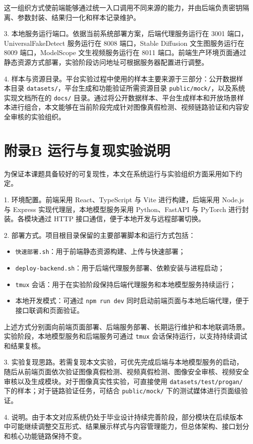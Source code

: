 这一组织方式使前端能够通过统一入口调用不同来源的能力，并由后端负责密钥隔离、参数封装、结果归一化和样本记录维护。

3. 本地服务运行端口。依据当前系统部署方案，后端代理服务运行在 3001 端口，UniversalFakeDetect 服务运行在 8008 端口，Stable Diffusion 文生图服务运行在 8009 端口，ModelScope 文生视频服务运行在 8011 端口。前端生产环境页面通过静态资源方式部署，实验阶段访问地址可根据服务器配置进行调整。

4. 样本与资源目录。平台实验过程中使用的样本主要来源于三部分：公开数据样本目录 \texttt{datasets/}，平台生成和功能验证所需资源目录 \texttt{public/mock/}，以及系统实现文档所在的 \texttt{docs/} 目录。通过将公开数据样本、平台生成样本和开放场景样本进行组合，本文能够在当前阶段完成针对图像真假检测、视频链路验证和内容安全审核的实验组织。

\section*{附录B 运行与复现实验说明}
{}

为保证本课题具备较好的可复现性，本文在系统运行与实验组织方面采用如下约定。

1. 环境配置。前端采用 React、TypeScript 与 Vite 进行构建，后端采用 Node.js 与 Express 实现代理层，本地模型服务采用 Python、FastAPI 与 PyTorch 进行封装。各模块通过 HTTP 接口通信，便于本地开发与远程部署切换。

2. 部署方式。项目根目录保留的主要部署脚本和运行方式包括：

\begin{itemize}
  \item \texttt{快速部署.sh}：用于前端静态资源构建、上传与快速部署；
  \item \texttt{deploy-backend.sh}：用于后端代理服务部署、依赖安装与进程启动；
  \item \texttt{tmux} 会话：用于在实验阶段保持后端代理服务和本地模型服务持续运行；
  \item 本地开发模式：可通过 \texttt{npm run dev} 同时启动前端页面与本地后端代理，便于接口联调和页面验证。
\end{itemize}

上述方式分别面向前端页面部署、后端服务部署、长期运行维护和本地联调场景。实验阶段，本地模型服务和后端服务可通过 \texttt{tmux} 会话保持运行，以支持持续调试和结果复核。

3. 实验复现思路。若需复现本文实验，可优先完成后端与本地模型服务的启动，随后从前端页面依次验证图像真假检测、视频真假检测、图像安全审核、视频安全审核以及生成模块。对于图像真实性实验，可直接使用 \texttt{datasets/test/progan/} 下的样本；对于链路验证任务，可结合 \texttt{public/mock/} 下的测试媒体进行页面级验证。

4. 说明。由于本文对应系统仍处于毕业设计持续完善阶段，部分模块在后续版本中可能继续调整交互形式、结果展示样式与内容管理能力，但总体架构、接口划分和核心功能链路保持不变。
